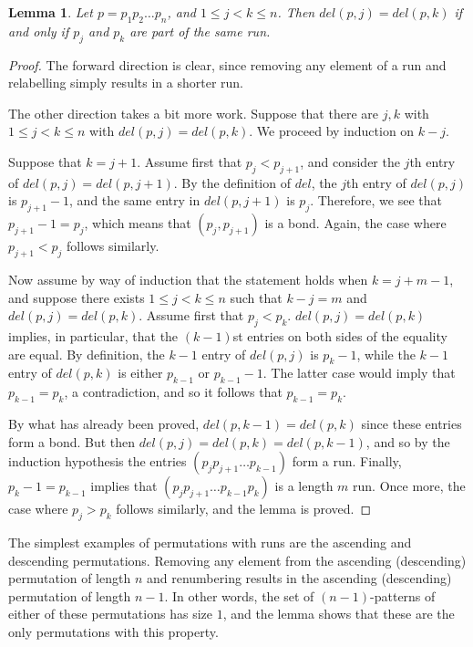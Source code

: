 \documentclass[11pt]{article}
\theoremstyle{plain}
\newtheorem{lem}[thm]{Lemma}
\theoremstyle{definition}
\begin{document}
  \begin{lem} \label{biglem} 
  Let $p = p_1p_2 \ldots p_n$, and $1 \leq j < k \leq
  n$. Then $del(p,j) = del(p,k)$ if and only if $p_j$ and $p_k$ are part of the same
  run.  
  \end{lem} 
  \begin{proof} The forward direction is clear, since removing any element of a
  run and relabelling simply results in a shorter run. 

  The other direction takes a bit more work. Suppose that there are $j,k$ with $1
  \leq j < k \leq n$ with $del(p,j) = del(p,k)$. We proceed by induction on $k-j$. 

  Suppose that $k =j+ 1$. Assume first that $p_j < p_{j+1}$, and consider the
  $j$th entry of $del(p,j)=del(p,j+1)$. By the definition of $del$, the $j$th
  entry of $del(p,j)$ is $p_{j+1}-1$, and the same entry in $del(p,j+1)$ is
  $p_j$. Therefore, we see that $p_{j+1}-1=p_j$, which means that
  $(p_j,p_{j+1})$ is a bond. Again, the case where $p_{j+1}<p_j$ follows
  similarly. 

  Now assume by way of induction that the statement holds when $k=j+m-1$, and
  suppose there exists $1\leq j < k \leq n$ such that $k-j = m$ and
  $del(p,j)=del(p,k)$. Assume first that $p_j < p_{k}$. $del(p,j)=del(p,k)$ implies, in
  particular, that the $(k-1)$st entries on both sides of the equality are equal.
  By definition, the $k-1$ entry of $del(p,j)$ is $p_k-1$, while the $k-1$ entry of
  $del(p,k)$ is either $p_{k-1}$ or $p_{k-1}-1$. The latter case would imply that
  $p_{k-1} = p_k$, a contradiction, and so it follows that $p_{k-1} = p_k$. 

  By what has already been proved, $del(p,k-1) = del(p,k)$ since these entries form a
  bond. But then $del(p,j) = del(p,k) = del(p,k-1)$, and so by the induction hypothesis
  the entries $(p_j p_{j+1} \ldots p_{k-1})$ form a run. Finally, $p_k - 1 =
  p_{k-1}$ implies that $(p_j p_{j+1} \ldots p_{k-1} p_k)$ is a length $m$ run.
  Once more, the case where $p_j > p_k$ follows similarly, and the lemma is
  proved.

  \end{proof}


  The simplest examples of permutations with runs are the ascending and descending
  permutations. Removing any element from the ascending (descending) permutation
  of length $n$ and renumbering results in the ascending (descending) permutation
  of length $n-1$. In other words, the set of $(n-1)$-patterns of either of these
  permutations has size $1$, and the lemma shows that these are the only
  permutations with this property. 
\end{document}
